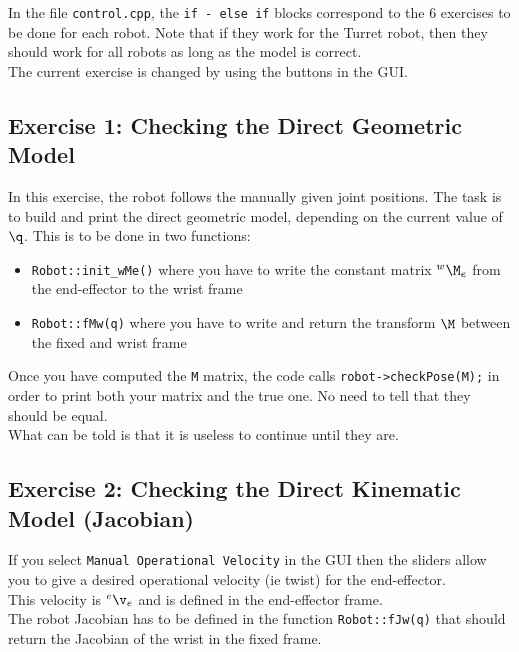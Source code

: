 \documentclass{ecnreport}
\begin{document}
  In the file \texttt{control.cpp}, the \texttt{if - else if} blocks correspond to the 6 exercises to be done for each robot. Note that if they work for the Turret robot, then 
  they should work for all robots as long as the model is correct. \\
  The current exercise is changed by using the buttons in the GUI.
  
  \subsection*{Exercise 1: Checking the Direct Geometric Model}
  
  In this exercise, the robot follows the manually given joint positions. The task is to build and print the direct geometric model, depending on the current value of $\q$. This is to be done in two functions:
  \begin{itemize}
    \item \texttt{Robot::init\_wMe()} where you have to write the constant matrix $\wMe$ from the end-effector to the wrist frame
    \item \texttt{Robot::fMw(q)}  where you have to write and return the transform $\M$ between the fixed and wrist frame
  \end{itemize}
  Once you have computed the \texttt{M} matrix, the code calls \texttt{robot->checkPose(M);} in order to print both your matrix and the true one. No need to tell that they should be equal.\\
  What can be told is that it is useless to continue until they are.
  
  \subsection*{Exercise 2: Checking the Direct Kinematic Model (Jacobian)}
  
  If you select \texttt{Manual Operational Velocity} in the GUI then the sliders allow you to give a desired operational velocity (ie twist) for the end-effector.\\
  This velocity is ${}^e\v_e$ and is defined in the end-effector frame.\\
  The robot Jacobian has to be defined in the function \texttt{Robot::fJw(q)} that should return the Jacobian of the wrist in the fixed frame.\\
  
\end{document}
